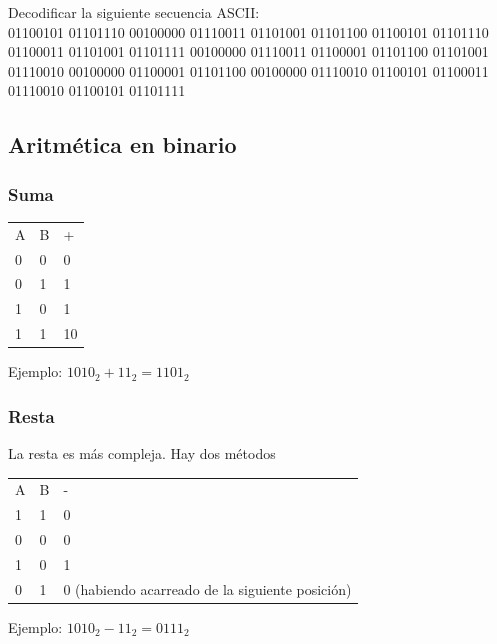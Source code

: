 \begin{frame}
    \begin{ejercicio}{}
    Decodificar la siguiente secuencia ASCII: \\
        01100101 01101110 00100000 01110011 01101001 01101100 01100101 01101110 01100011 01101001 01101111 00100000 01110011 01100001 01101100 01101001 01110010 00100000 01100001 01101100 00100000 01110010 01100101 01100011 01110010 01100101 01101111
    \end{ejercicio}
\end{frame}


\subsection{Aritm\'etica en binario}

\begin{frame}
    \frametitle{Suma}
    \begin{table}[]
    \centering
    \begin{tabular}{lll}
        A & B & + \\
        0 & 0 & 0\\
        0 & 1 & 1\\
        1 & 0 & 1\\
        1 & 1 & 10 \\
    \end{tabular}
    \end{table}

    Ejemplo:
    $1010_{2} + 11_{2} = 1101_{2}$
\end{frame}

\begin{frame}
    \frametitle{Resta}
    La resta es m\'as compleja. Hay dos m\'etodos
    \begin{table}[]
    \centering
    \begin{tabular}{lll}
        A & B & - \\
        1 & 1 & 0\\
        0 & 0 & 0\\
        1 & 0 & 1\\
        0 & 1 & 0 (habiendo acarreado de la siguiente posici\'on)\\
    \end{tabular}
    \end{table}
    Ejemplo:
    $1010_{2} - 11_{2} = 0111_{2}$
\end{frame}

